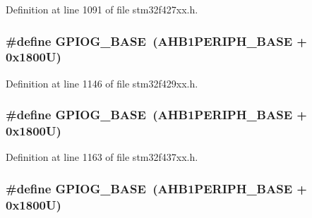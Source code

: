 Definition at line 1091 of file stm32f427xx.\+h.

\subsubsection[{\texorpdfstring{G\+P\+I\+O\+G\+\_\+\+B\+A\+SE}{GPIOG_BASE}}]{\setlength{\rightskip}{0pt plus 5cm}\#define G\+P\+I\+O\+G\+\_\+\+B\+A\+SE~({\bf A\+H\+B1\+P\+E\+R\+I\+P\+H\+\_\+\+B\+A\+SE} + 0x1800\+U)}\hypertarget{group___peripheral__memory__map_ga5d8ca4020f2e8c00bde974e8e7c13cfe}{}\label{group___peripheral__memory__map_ga5d8ca4020f2e8c00bde974e8e7c13cfe}


Definition at line 1146 of file stm32f429xx.\+h.

\subsubsection[{\texorpdfstring{G\+P\+I\+O\+G\+\_\+\+B\+A\+SE}{GPIOG_BASE}}]{\setlength{\rightskip}{0pt plus 5cm}\#define G\+P\+I\+O\+G\+\_\+\+B\+A\+SE~({\bf A\+H\+B1\+P\+E\+R\+I\+P\+H\+\_\+\+B\+A\+SE} + 0x1800\+U)}\hypertarget{group___peripheral__memory__map_ga5d8ca4020f2e8c00bde974e8e7c13cfe}{}\label{group___peripheral__memory__map_ga5d8ca4020f2e8c00bde974e8e7c13cfe}


Definition at line 1163 of file stm32f437xx.\+h.

\subsubsection[{\texorpdfstring{G\+P\+I\+O\+G\+\_\+\+B\+A\+SE}{GPIOG_BASE}}]{\setlength{\rightskip}{0pt plus 5cm}\#define G\+P\+I\+O\+G\+\_\+\+B\+A\+SE~({\bf A\+H\+B1\+P\+E\+R\+I\+P\+H\+\_\+\+B\+A\+SE} + 0x1800\+U)}\hypertarget{group___peripheral__memory__map_ga5d8ca4020f2e8c00bde974e8e7c13cfe}{}\label{group___peripheral__memory__map_ga5d8ca4020f2e8c00bde974e8e7c13cfe}



